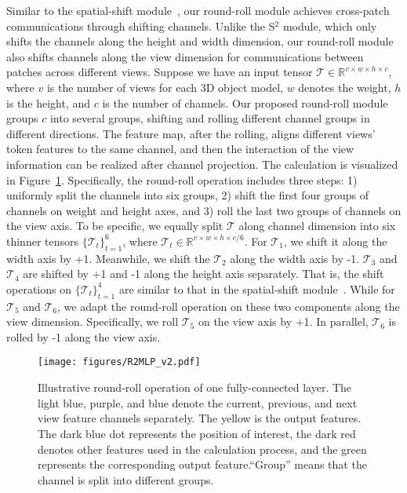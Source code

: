 \documentclass[11pt]{article}
\begin{document}
Similar to the spatial-shift module~\citep{yu2022s2mlp}, our round-roll module achieves cross-patch communications through shifting channels. Unlike the S$^2$ module, which only shifts the channels along the height and width dimension, our round-roll module also shifts channels along the view dimension for communications between patches across different views. Suppose we have an input tensor $\bm{\mathcal{T}} \in \mathbb{R}^{v \times w \times h \times c}$, where $v$ is the number of views for each 3D object model, $w$ denotes the weight, $h$ is the height, and $c$ is the number of channels.
Our proposed round-roll module groups $c$ into several groups, shifting and rolling different channel groups in different directions. The feature map, after the rolling, aligns different views' token features to the same channel, and then the interaction of the view information can be realized after channel projection.
The calculation is visualized in Figure~\ref{fig:illustrative}.
Specifically, the round-roll operation includes three steps: 1) uniformly split the channels into six groups, 2) shift the first four groups of channels on weight and height axes, and 3) roll the last two groups of channels on the view axis. To be specific, we equally split $\bm{\mathcal{T}}$ along channel dimension into six thinner tensors $\{ \bm{\mathcal{T}}_t \}_{t=1}^6$, where $\bm{\mathcal{T}}_t \in \mathbb{R}^{v \times w \times h \times c/6}$. For $\bm{\mathcal{T}}_1$, we shift it along the width axis by +1. Meanwhile, we shift the $\bm{\mathcal{T}}_2$ along the width axis by -1. $\bm{\mathcal{T}}_3$ and $\bm{\mathcal{T}}_4$ are shifted by +1 and -1 along the height axis separately. That is, the shift operations on $\{ \bm{\mathcal{T}}_t \}_{t=1}^4$ are similar to that in  the spatial-shift module~\citep{yu2022s2mlp}. While for $\bm{\mathcal{T}}_5$ and $\bm{\mathcal{T}}_6$, we adapt the round-roll operation on these two components along the view dimension. Specifically, we roll $\bm{\mathcal{T}}_5$ on the view axis by +1. In parallel, $\bm{\mathcal{T}}_6$ is rolled by -1 along the view axis.


\begin{figure}[t!]
\centering
\texttt{[image: figures/R2MLP\_v2.pdf]}
\caption{
Illustrative round-roll operation of one fully-connected layer. The light blue, purple, and blue denote the current, previous, and next view feature channels separately. The yellow is the output features. The dark blue dot represents the position of interest, the dark red denotes other features used in the calculation process, and the green represents the corresponding output feature.``Group'' means that the channel is split into different groups.
}
\label{fig:illustrative}
\end{figure}
\end{document}
